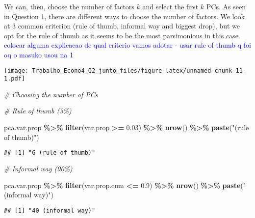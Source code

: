 \documentclass[
]{article}
\newenvironment{Shaded}{\begin{snugshade}}{\end{snugshade}}
\newcommand{\CommentTok}[1]{\textcolor[rgb]{0.56,0.35,0.01}{\textit{#1}}}
\newcommand{\DecValTok}[1]{\textcolor[rgb]{0.00,0.00,0.81}{#1}}
\newcommand{\FloatTok}[1]{\textcolor[rgb]{0.00,0.00,0.81}{#1}}
\newcommand{\FunctionTok}[1]{\textcolor[rgb]{0.13,0.29,0.53}{\textbf{#1}}}
\newcommand{\NormalTok}[1]{#1}
\newcommand{\SpecialCharTok}[1]{\textcolor[rgb]{0.81,0.36,0.00}{\textbf{#1}}}
\newcommand{\StringTok}[1]{\textcolor[rgb]{0.31,0.60,0.02}{#1}}
\begin{document}
We can, then, choose the number of factors \(k\) and select the first
\(k\) PCs. As seen in Question 1, there are different ways to choose the
number of factors. We look at 3 common criterion (rule of thumb,
informal way and biggest drop), but we opt for the rule of thumb as it
seems to be the most parsimonious in this case.
\textcolor{blue}{colocar alguma explicacao de qual criterio vamos adotar - usar rule of thumb q foi oq o masuko usou na 1}

\texttt{[image: Trabalho\_Econo4\_Q2\_junto\_files/figure-latex/unnamed-chunk-11-1.pdf]}

\begin{Shaded}
\begin{Highlighting}[]
\CommentTok{\# Choosing the number of PCs}

\CommentTok{\# Rule of thumb (3\%)}

\NormalTok{pca.var.prop }\SpecialCharTok{\%\textgreater{}\%}
    \FunctionTok{filter}\NormalTok{(var.prop }\SpecialCharTok{\textgreater{}=} \FloatTok{0.03}\NormalTok{) }\SpecialCharTok{\%\textgreater{}\%}
    \FunctionTok{nrow}\NormalTok{() }\SpecialCharTok{\%\textgreater{}\%}
    \FunctionTok{paste}\NormalTok{(}\StringTok{"(rule of thumb)"}\NormalTok{)}
\end{Highlighting}
\end{Shaded}

\begin{verbatim}
## [1] "6 (rule of thumb)"
\end{verbatim}

\begin{Shaded}
\begin{Highlighting}[]
\CommentTok{\# Informal way (90\%)}

\NormalTok{pca.var.prop }\SpecialCharTok{\%\textgreater{}\%}
    \FunctionTok{filter}\NormalTok{(var.prop.cum }\SpecialCharTok{\textless{}=} \FloatTok{0.9}\NormalTok{) }\SpecialCharTok{\%\textgreater{}\%}
    \FunctionTok{nrow}\NormalTok{() }\SpecialCharTok{\%\textgreater{}\%}
    \FunctionTok{paste}\NormalTok{(}\StringTok{"(informal way)"}\NormalTok{)}
\end{Highlighting}
\end{Shaded}

\begin{verbatim}
## [1] "40 (informal way)"
\end{verbatim}

\begin{Shaded}
\end{Shaded}
\end{document}
